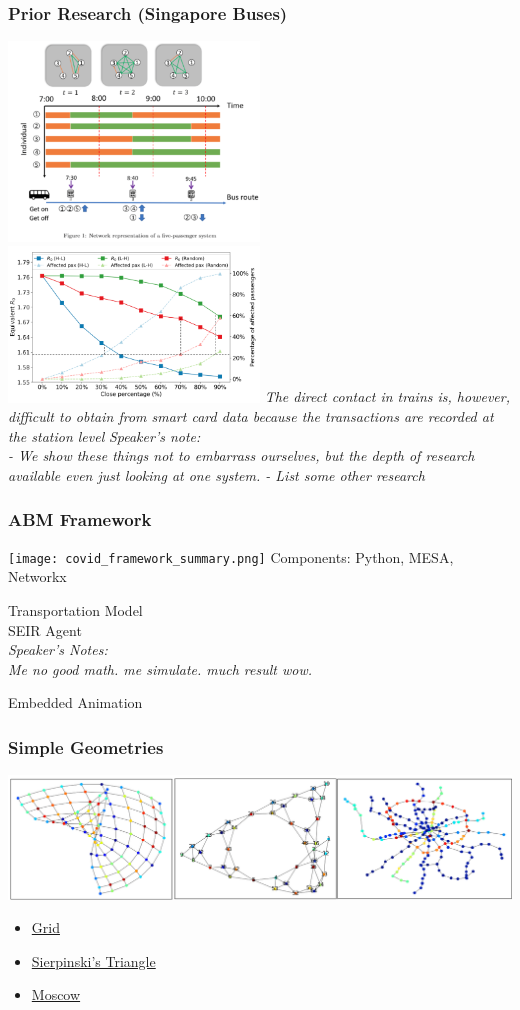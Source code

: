 \documentclass{beamer}
\begin{document}
\begin{frame}
\frametitle{Prior Research (Singapore Buses)}
\includegraphics[width=0.5\textwidth]{Singapore_1.png}%
\includegraphics[width=0.5\textwidth]{Singapore_2.png}
\textit{The direct contact in trains is, however, difficult to obtain from smart card data because the transactions are recorded at the station level}
\cite{singapore_bus_2020}
\textit{Speaker's note:\\
- We show these things not to embarrass ourselves, but the depth of research available even just looking at one system.
- List some other research
}
\end{frame}
\begin{frame}
\frametitle{ABM Framework}
\texttt{[image: covid\_framework\_summary.png]}
Components: Python, MESA, Networkx

Transportation Model\\
SEIR Agent\\
\textit{Speaker's Notes:\\
Me no good math. me simulate.
much result wow.}
\end{frame}
\begin{frame}{Embedded Animation}
\frametitle{Simple Geometries}
\includegraphics[width=1.0\textwidth]{geometries_example.png}
\begin{itemize}
    \item \href{https://github.com/cheung-ho-lum/NS_Epidemics_ABM_Approach/blob/master/Repository/Visualizations/infection_timelapse_grid_01.gif}{Grid}
    \item \href{https://github.com/cheung-ho-lum/NS_Epidemics_ABM_Approach/blob/master/Repository/Visualizations/infection_timelapse_sierpinski_01.gif}{Sierpinski's Triangle}
    \item \href{https://github.com/cheung-ho-lum/NS_Epidemics_ABM_Approach/blob/master/Repository/Visualizations/infection_timelapse_moscow.gif}{Moscow}
\end{itemize}
\end{frame}
\end{document}
